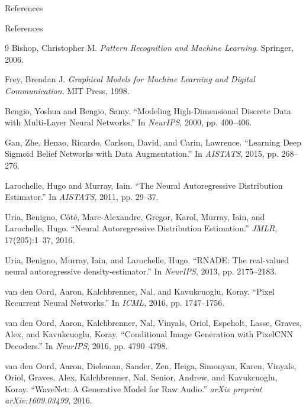 \begin{frame}[allowframebreaks]{}
    \centering
    \LARGE References
\end{frame}

\begin{frame}[allowframebreaks]{References}
\begin{thebibliography}{9}
Bishop, Christopher M. \emph{Pattern Recognition and Machine Learning}. Springer, 2006.

Frey, Brendan J. \emph{Graphical Models for Machine Learning and Digital Communication}. MIT Press, 1998.

Bengio, Yoshua and Bengio, Samy. ``Modeling High-Dimensional Discrete Data with Multi-Layer Neural Networks.'' In \emph{NeurIPS}, 2000, pp. 400--406.

Gan, Zhe, Henao, Ricardo, Carlson, David, and Carin, Lawrence. ``Learning Deep Sigmoid Belief Networks with Data Augmentation.'' In \emph{AISTATS}, 2015, pp. 268--276.

Larochelle, Hugo and Murray, Iain. ``The Neural Autoregressive Distribution Estimator.'' In \emph{AISTATS}, 2011, pp. 29--37.

Uria, Benigno, C\^ot\'e, Marc-Alexandre, Gregor, Karol, Murray, Iain, and Larochelle, Hugo. ``Neural Autoregressive Distribution Estimation.'' \emph{JMLR}, 17(205):1--37, 2016.

Uria, Benigno, Murray, Iain, and Larochelle, Hugo. ``RNADE: The real-valued neural autoregressive density-estimator.'' In \emph{NeurIPS}, 2013, pp. 2175--2183.

van den Oord, Aaron, Kalchbrenner, Nal, and Kavukcuoglu, Koray. ``Pixel Recurrent Neural Networks.'' In \emph{ICML}, 2016, pp. 1747--1756.

van den Oord, Aaron, Kalchbrenner, Nal, Vinyals, Oriol, Espeholt, Lasse, Graves, Alex, and Kavukcuoglu, Koray. ``Conditional Image Generation with PixelCNN Decoders.'' In \emph{NeurIPS}, 2016, pp. 4790--4798.

van den Oord, Aaron, Dieleman, Sander, Zen, Heiga, Simonyan, Karen, Vinyals, Oriol, Graves, Alex, Kalchbrenner, Nal, Senior, Andrew, and Kavukcuoglu, Koray. ``WaveNet: A Generative Model for Raw Audio.'' \emph{arXiv preprint arXiv:1609.03499}, 2016.


\end{thebibliography}
\end{frame}
